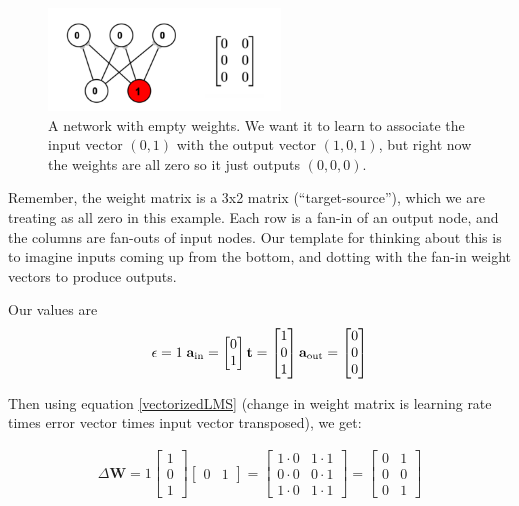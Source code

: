 \begin{figure}[h]
\centering
\includegraphics[width=0.55\textwidth]{images/vectorLMSBeforeTrain.png}
\caption[Jeff Yoshimi.]{A network with empty weights. We want it to learn to associate the input vector $(0,1)$ with the output vector $(1,0,1)$, but right now the weights are all zero so it just outputs $(0,0,0)$. }
\label{lms_vector_pre}
\end{figure}

Remember, the weight matrix is a 3x2 matrix  (``target-source''), which we are treating as all zero in this example. Each row is a fan-in of an output node, and the columns are fan-outs of input nodes. Our template for thinking about this is to imagine inputs coming up from the bottom, and dotting with the fan-in weight vectors to produce outputs.

Our values are
\begin{equation*}
\epsilon = 1 \; \; \\
\mathbf{a}_{\text{in}} = \begin{bmatrix} 0 \\ 1 \end{bmatrix} \\
\mathbf{t} = \begin{bmatrix} 1 \\ 0 \\ 1 \end{bmatrix}
\mathbf{a}_{\text{out}} = \begin{bmatrix} 0 \\ 0 \\ 0 \end{bmatrix}
\end{equation*}

Then using equation \eqref{vectorizedLMS} (change in weight matrix is learning rate times error vector times input vector transposed), we get:

\begin{align*}
\Delta \mathbf{W}  = 1
\begin{bmatrix} 1 \\ 0 \\ 1 \end{bmatrix} 
\begin{bmatrix} 0 & 1 \end{bmatrix} 
= \begin{bmatrix} 1 \cdot 0 & 1 \cdot 1 \\ 0 \cdot 0 & 0 \cdot 1 \\ 1 \cdot 0 & 1 \cdot 1 \end{bmatrix} 
= \begin{bmatrix} 0 & 1 \\ 0 & 0 \\  0 & 1  \end{bmatrix}
\end{align*}

